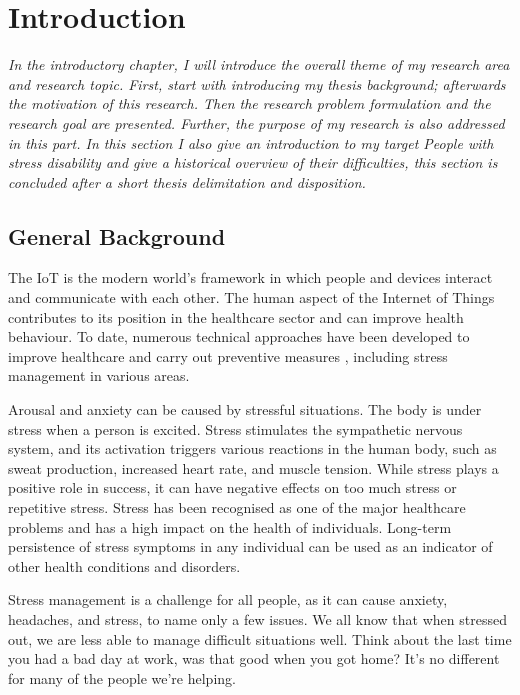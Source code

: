\chapter{Introduction}
\textit{In the introductory chapter, I will introduce the overall theme of my research area and research topic. First, start with introducing my thesis background; afterwards the motivation of this research. Then the research problem formulation and the research goal are presented. Further, the purpose of my research is also addressed in this part. In this section I also give an introduction to my target People with stress disability and give a historical overview of their difficulties, this section is concluded after a short thesis delimitation and disposition.}
\vspace{5mm}

\section{General Background}
The \acf{IoT} is the modern world's framework in which people and devices interact and communicate with each other.  The human aspect of the Internet of Things contributes to its position in the healthcare sector and can improve health behaviour. To date, numerous technical approaches have been developed to improve healthcare and carry out preventive measures \citep{Trmcic2017InternetWell-being}, including stress management in various areas.

Arousal and anxiety can be caused by stressful situations.  The body is under stress when a person is excited. Stress stimulates the sympathetic nervous system, and its activation triggers various reactions in the human body, such as sweat production, increased heart rate, and muscle tension. While stress plays a positive role in success, it can have negative effects on too much stress or repetitive stress. Stress has been recognised as one of the major healthcare problems and has a high impact on the health of individuals. Long-term persistence of stress symptoms in any individual can be used as an indicator of other health conditions and disorders.

Stress management is a challenge for all people, as it can cause anxiety, headaches, and stress, to name only a few issues. We all know that when stressed out, we are less able to manage difficult situations well. Think about the last time you had a bad day at work, was that good when you got home? It's no different for many of the people we're helping.

